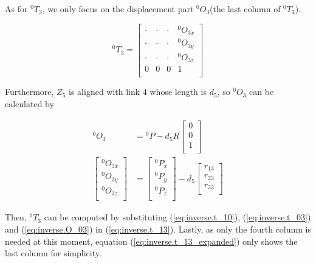 \documentclass{article}
\newcommand{\T}[2]{{}^{#1}T_{#2}}
\renewcommand{\O}[2]{{}^{#1}O_{#2}}
\begin{document}
As for  $\T{0}{3}$, we only focus on the displacement part $\O{0}{3}$(the last column of $\T{0}{3}$).

\begin{equation}
\label{eq:inverse.t_03}
\T{0}{3} = \left[ \begin{array}{cccc}
	\cdot & \cdot & \cdot & {}^0O_{3x} \\
	\cdot & \cdot & \cdot & {}^0O_{3y} \\
	\cdot & \cdot & \cdot & {}^0O_{3z} \\
	0 & 0 & 0 & 1 \\
\end{array} \right]
\end{equation}

Furthermore, $Z_5$ is aligned with link 4 whose length is $d_5$, so $\O{0}{3}$ can be calculated by

\begin{equation}
\label{eq:inverse.O_03}
\begin{aligned}
\O{0}{3} & = {}^0P - d_5 R\left[
\begin{array}{c}
	0 \\
	0 \\
	1 \\
\end{array} \right]  \\
\left[
\begin{array}{c}
	{}^0O_{3x} \\
	{}^0O_{3y} \\
	{}^0O_{3z} \\
\end{array} \right] & = \left[
\begin{array}{c}
	{}^0P_x \\
	{}^0P_y \\
	{}^0P_z \\
\end{array}
\right] - d_5 \left[ \begin{array}{c}
	{}r_{13} \\
	{}r_{23} \\
	{}r_{33} \\
\end{array} \right]
\end{aligned}
\end{equation}

Then, $\T{1}{3}$ can be computed by substituting (\ref{eq:inverse.t_10}), (\ref{eq:inverse.t_03}) and (\ref{eq:inverse.O_03}) in (\ref{eq:inverse.t_13}). Lastly, as only the fourth column is needed at this moment, equation (\ref{eq:inverse.t_13_expanded}) only shows the last column for simplicity.
\end{document}
